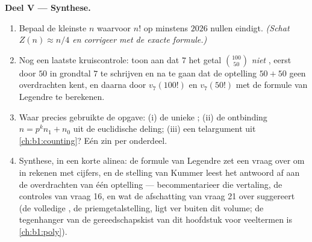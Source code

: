 \begin{problem}
\medskip
\noindent\textbf{Deel V --- Synthese.}
\begin{enumerate}[resume]
  \item Bepaal de kleinste $n$ waarvoor $n!$ op minstens $2026$ nullen
        eindigt. \emph{(Schat $Z(n) \approx n/4$ en corrigeer met de
        exacte formule.)}
  \item Nog een laatste kruiscontrole: toon aan dat $7$ het getal
        $\binom{100}{50}$ \emph{niet} , eerst door $50$ in grondtal
        $7$ te schrijven en na te gaan dat de optelling $50 + 50$ geen
        overdrachten kent, en daarna door $v_7(100!)$ en $v_7(50!)$ met
        de formule van Legendre te berekenen.
  \item Waar precies gebruikte de opgave: (i) de unieke ;
        (ii) de ontbinding $n = p^k n_1 + n_0$ uit de euclidische
        deling; (iii) een telargument uit \cref{ch:b1:counting}? Eén zin
        per onderdeel.
  \item Synthese, in een korte alinea: de formule van Legendre zet een
        vraag over  om in rekenen met cijfers, en de stelling
        van Kummer leest het antwoord af aan de overdrachten van één
        optelling --- becommentarieer die vertaling, de controles van
        vraag 16, en wat de afschatting van vraag 21 over 
        suggereert (de volledige , de priemgetalstelling, ligt
        ver buiten dit volume; de tegenhanger van de gereedschapskist
        van dit hoofdstuk voor veeltermen is \cref{ch:b1:poly}).
\end{enumerate}
\end{problem}
